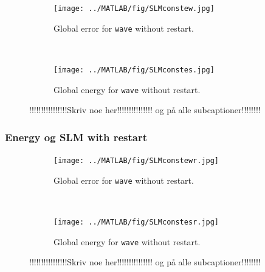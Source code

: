 \begin{figure}[H]
        \centering
        \begin{subfigure}[b]{0.45\textwidth}
                \texttt{[image: ../MATLAB/fig/SLMconstew.jpg]}
                \caption{Global error for \texttt{wave} without restart.}
                \label{fig:SLMconstew}
        \end{subfigure}
        ~
        \begin{subfigure}[b]{0.45\textwidth}
                \texttt{[image: ../MATLAB/fig/SLMconstes.jpg]}
                \caption{Global energy for \texttt{wave} without restart.}
                \label{fig:SLMconstes}
        \end{subfigure}

        \caption{ !!!!!!!!!!!!!!!!Skriv noe her!!!!!!!!!!!!!!! og på alle subcaptioner!!!!!!!!}
        \label{fig:SLMconste}
\end{figure}

\subsubsection{Energy og SLM with restart} %
\begin{figure}[H]
        \centering
        \begin{subfigure}[b]{0.45\textwidth}
                \texttt{[image: ../MATLAB/fig/SLMconstewr.jpg]}
                \caption{Global error for \texttt{wave} without restart.}
                \label{fig:SLMconstewr}
        \end{subfigure}
        ~
        \begin{subfigure}[b]{0.45\textwidth}
                \texttt{[image: ../MATLAB/fig/SLMconstesr.jpg]}
                \caption{Global energy for \texttt{wave} without restart.}
                \label{fig:SLMconstesr}
        \end{subfigure}
        \caption{ !!!!!!!!!!!!!!!!Skriv noe her!!!!!!!!!!!!!!! og på alle subcaptioner!!!!!!!!}
        \label{fig:SLMconster}
\end{figure}


